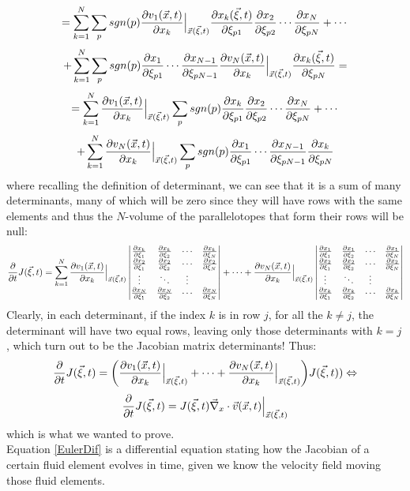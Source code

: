 \documentclass[11pt, a4paper]{article} %
\begin{document}
{$$
=\sum_{k=1}^N\sum_p sgn(p) \pdv{v_1(\vec{x},t)}{x_k}\Big\rvert_{\vec{x}(\vec{\xi},t)}\pdv{x_k(\vec{\xi},t)}{\xi_{p1}}\pdv{x_2}{\xi_{p2}} \cdots \pdv{x_N}{\xi_{pN}}+\cdots 
$$
$$
+ \sum_{k=1}^N\sum_p sgn(p)\pdv{x_1}{\xi_{p1}} \cdots \pdv{x_{N-1}}{\xi_{pN-1}}\pdv{v_N(\vec{x},t)}{x_k}\Big\rvert_{\vec{x}(\vec{\xi},t)}\pdv{x_k(\vec{\xi},t)}{\xi_{pN}}=
$$
$$
=\sum_{k=1}^N \pdv{v_1(\vec{x},t)}{x_k}\Big\rvert_{\vec{x}(\vec{\xi},t)}\sum_p sgn(p)\pdv{x_k}{\xi_{p1}}\pdv{x_2}{\xi_{p2}} \cdots \pdv{x_N}{\xi_{pN}}+\cdots 
$$
$$
+ \sum_{k=1}^N\pdv{v_N(\vec{x},t)}{x_k}\Big\rvert_{\vec{x}(\vec{\xi},t)}\sum_p sgn(p)\pdv{x_1}{\xi_{p1}} \cdots \pdv{x_{N-1}}{\xi_{pN-1}}\pdv{x_k}{\xi_{pN}}
$$
where recalling the definition of determinant, we can see that it is a sum of many determinants, many of which will be zero since they will have rows with the same elements and thus the $N$-volume of the parallelotopes that form their rows will be null:
\begin{equation}
\pdv{}{t}J(\vec{\xi},t)=\sum_{k=1}^N \pdv{v_1(\vec{x},t)}{x_k}\Big\rvert_{\vec{x}(\vec{\xi},t)} \begin{vmatrix}
\pdv{x_k}{\xi_{1}}&\pdv{x_k}{\xi_{2}} &\cdots &\pdv{x_k}{\xi_{N}}\\
\pdv{x_2}{\xi_{1}}&\pdv{x_2}{\xi_{2}} &\cdots &\pdv{x_2}{\xi_{N}}\\
\vdots & \ddots & \vdots\\
\pdv{x_N}{\xi_{1}}&\pdv{x_N}{\xi_{2}} &\cdots &\pdv{x_N}{\xi_{N}}
\end{vmatrix}+\cdots+
\pdv{v_N(\vec{x},t)}{x_k}\Big\rvert_{\vec{x}(\vec{\xi},t)} \begin{vmatrix}
\pdv{x_1}{\xi_{1}}&\pdv{x_1}{\xi_{2}} &\cdots &\pdv{x_1}{\xi_{N}}\\
\pdv{x_2}{\xi_{1}}&\pdv{x_2}{\xi_{2}} &\cdots &\pdv{x_2}{\xi_{N}}\\
\vdots & \ddots & \vdots\\
\pdv{x_k}{\xi_{1}}&\pdv{x_k}{\xi_{2}} &\cdots &\pdv{x_k}{\xi_{N}}
\end{vmatrix}
\end{equation}
Clearly, in each determinant, if the index $k$ is in row $j$, for all the $k\neq j$, the determinant will have two equal rows, leaving only those determinants with $k=j$, which turn out to be the Jacobian matrix determinants! Thus:
\begin{equation}
\pdv{}{t}J(\vec{\xi},t)=\qty(\pdv{v_1(\vec{x},t)}{x_k}\Big\rvert_{\vec{x}(\vec{\xi},t)}+\cdots+\pdv{v_N(\vec{x},t)}{x_k}\Big\rvert_{\vec{x}(\vec{\xi},t)}) J(\vec{\xi},t))\Leftrightarrow
\end{equation}
\begin{equation}\label{EulerDif}
\pdv{}{t}J(\vec{\xi},t)=J(\vec{\xi},t)\vec{\nabla}_x\cdot\vec{v}(\vec{x},t)\Big\rvert_{\vec{x}(\vec{\xi},t)}
\end{equation}
which is what we wanted to prove.\\
Equation \eqref{EulerDif} is a differential equation stating how the Jacobian of a certain fluid element evolves in time, given we know the velocity field moving those fluid elements.\\
}
\end{document}
